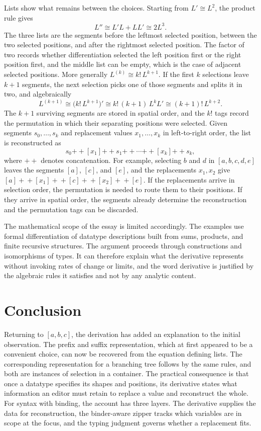 \documentclass[11pt]{article}
\begin{document}
Lists show what remains between the choices. Starting from $L'\cong L^2$, the product rule gives
\[
L''\cong L'L+LL'\cong 2L^3.
\]
The three lists are the segments before the leftmost selected position, between the two selected positions, and after the rightmost selected position. The factor of two records whether differentiation selected the left position first or the right position first, and the middle list can be empty, which is the case of adjacent selected positions. More generally $L^{(k)}\cong k!\,L^{k+1}$. If the first $k$ selections leave $k+1$ segments, the next selection picks one of those segments and splits it in two, and algebraically
\[
L^{(k+1)}\cong\bigl(k!\,L^{k+1}\bigr)'\cong k!\,(k+1)\,L^{k}L'\cong(k+1)!\,L^{k+2}.
\]
The $k+1$ surviving segments are stored in spatial order, and the $k!$ tags record the permutation in which their separating positions were selected. Given segments $s_0,\dots,s_k$ and replacement values $x_1,\dots,x_k$ in left-to-right order, the list is reconstructed as
\[
s_0\mathbin{+\!\!+}[x_1]\mathbin{+\!\!+}s_1\mathbin{+\!\!+}\cdots\mathbin{+\!\!+}[x_k]\mathbin{+\!\!+}s_k,
\]
where $+\!\!+$ denotes concatenation. For example, selecting $b$ and $d$ in $[a,b,c,d,e]$ leaves the segments $[a]$, $[c]$, and $[e]$, and the replacements $x_1,x_2$ give $[a]+\!\!+[x_1]+\!\!+[c]+\!\!+[x_2]+\!\!+[e]$. If the replacements arrive in selection order, the permutation is needed to route them to their positions. If they arrive in spatial order, the segments already determine the reconstruction and the permutation tags can be discarded.

The mathematical scope of the essay is limited accordingly. The examples use formal differentiation of datatype descriptions built from sums, products, and finite recursive structures. The argument proceeds through constructions and isomorphisms of types. It can therefore explain what the derivative represents without invoking rates of change or limits, and the word derivative is justified by the algebraic rules it satisfies and not by any analytic content.

\section{Conclusion}

Returning to $[a,b,c]$, the derivation has added an explanation to the initial observation. The prefix and suffix representation, which at first appeared to be a convenient choice, can now be recovered from the equation defining lists. The corresponding representation for a branching tree follows by the same rules, and both are instances of selection in a container. The practical consequence is that once a datatype specifies its shapes and positions, its derivative states what information an editor must retain to replace a value and reconstruct the whole. For syntax with binding, the account has three layers. The derivative supplies the data for reconstruction, the binder-aware zipper tracks which variables are in scope at the focus, and the typing judgment governs whether a replacement fits.
\end{document}
